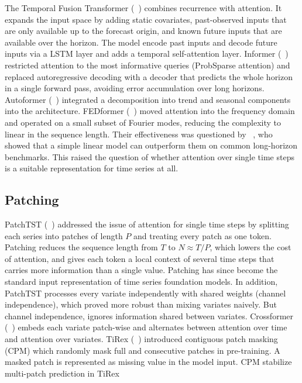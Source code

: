 The Temporal Fusion Transformer (\citeauthor{temporalfusiontransformers}~\cite{temporalfusiontransformers}) combines recurrence with attention. It expands the input space by adding static covariates, past-observed inputs that are only available up to the forecast origin, and known future inputs that are available over the horizon. The model encode past inputs and decode future inputs via a LSTM layer and adds a temporal self-attention layer. Informer (\citeauthor{informer}~\cite{informer}) restricted attention to the most informative queries (ProbSparse attention) and replaced autoregressive decoding with a decoder that predicts the whole horizon in a single forward pass, avoiding error accumulation over long horizons. Autoformer (\citeauthor{autoformer}~\cite{autoformer}) integrated a decomposition into trend and seasonal components into the architecture. FEDformer (\citeauthor{fedformer}~\cite{fedformer}) moved attention into the frequency domain and operated on a small subset of Fourier modes, reducing the complexity to linear in the sequence length. Their effectiveness was questioned by \citeauthor{dlinear}~\cite{dlinear}, who showed that a simple linear model can outperform them on common long-horizon benchmarks. This raised the question of whether attention over single time steps is a suitable representation for time series at all.


\subsection{Patching}
\label{sec:rw_patching}

PatchTST (\citeauthor{patchtst}~\cite{patchtst}) addressed the issue of attention for single time steps by splitting each series into patches of length $P$ and treating every patch as one token. Patching reduces the sequence length from $T$ to $N \approx T/P$, which lowers the cost of attention, and gives each token a local context of several time steps that carries more information than a single value. Patching has since become the standard input representation of time series foundation models. In addition, PatchTST processes every variate independently with shared weights (channel independence), which proved more robust than mixing variates naively. But channel independence, ignores information shared between variates. Crossformer (\citeauthor{crossformer}~\cite{crossformer}) embeds each variate patch-wise and alternates between attention over time and attention over variates. TiRex (\citeauthor{tirex1}~\cite{tirex1}) introduced contiguous patch masking (CPM) which randomly mask full and consecutive patches in pre-training. A masked patch is represented as missing value in the model input. CPM stabilize multi-patch prediction in TiRex


